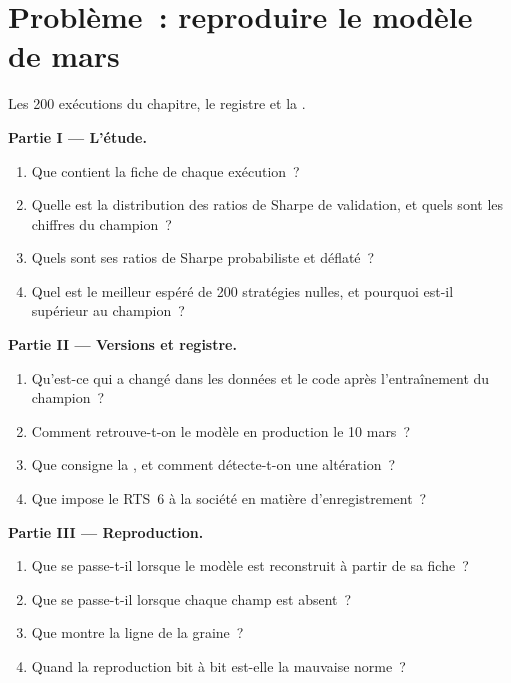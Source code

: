 \section{Problème~: reproduire le modèle de mars}

\begin{problem}\label{pb:ml:experiment-tracking-and-reproducibility:1}
Les 200 exécutions du chapitre, le registre et la .

\medskip\noindent\textbf{Partie I --- L'étude.}
\begin{enumerate}
\item Que contient la fiche de chaque exécution~?
\item Quelle est la distribution des ratios de Sharpe de validation, et quels sont les chiffres du champion~?
\item Quels sont ses ratios de Sharpe probabiliste et déflaté~?
\item Quel est le meilleur espéré de 200 stratégies nulles, et pourquoi est-il supérieur au champion~?
\end{enumerate}

\medskip\noindent\textbf{Partie II --- Versions et registre.}
\begin{enumerate}[resume]
\item Qu'est-ce qui a changé dans les données et le code après l'entraînement du champion~?
\item Comment retrouve-t-on le modèle en production le 10 mars~?
\item Que consigne la , et comment détecte-t-on une altération~?
\item Que impose le RTS~6 à la société en matière d'enregistrement~?
\end{enumerate}

\medskip\noindent\textbf{Partie III --- Reproduction.}
\begin{enumerate}[resume]
\item Que se passe-t-il lorsque le modèle est reconstruit à partir de sa fiche~?
\item Que se passe-t-il lorsque chaque champ est absent~?
\item Que montre la ligne de la graine~?
\item Quand la reproduction bit à bit est-elle la mauvaise norme~?
\end{enumerate}


\end{problem}
